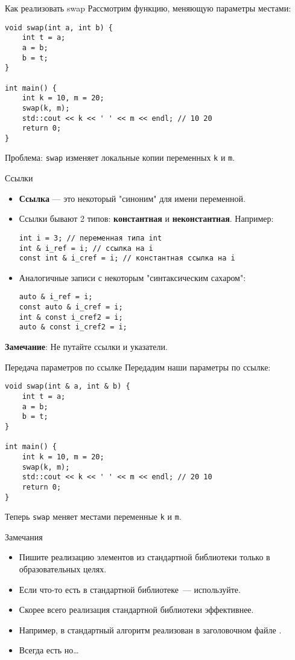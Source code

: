 \documentclass{beamer}
\begin{document}
\begin{frame}[fragile]{Как реализовать swap}
    Рассмотрим функцию, меняющую параметры местами:
    \begin{lstlisting}
void swap(int a, int b) {
    int t = a;
    a = b;
    b = t;
}

int main() {
    int k = 10, m = 20;
    swap(k, m);
    std::cout << k << ' ' << m << endl; // 10 20
    return 0;
}
    \end{lstlisting}
    Проблема: {\tt swap} изменяет локальные копии переменных {\tt k} и {\tt m}.
\end{frame}

\begin{frame}[fragile]{Ссылки}
    \begin{itemize}
        \item {\bf Ссылка} — это некоторый "синоним" для имени переменной.
        \item Ссылки бывают 2 типов: {\bf константная} и {\bf неконстантная}. Например:
            \begin{lstlisting}
int i = 3; // переменная типа int
int & i_ref = i; // ссылка на i
const int & i_cref = i; // константная ссылка на i
            \end{lstlisting}
        \item Аналогичные записи с некоторым "синтаксическим сахаром":
            \begin{lstlisting}
auto & i_ref = i;
const auto & i_cref = i;
int & const i_cref2 = i;
auto & const i_cref2 = i;
            \end{lstlisting}
    \end{itemize}
    {\bf Замечание}: Не путайте ссылки и указатели.
\end{frame}

\begin{frame}[fragile]{Передача параметров по ссылке}
    Передадим наши параметры по ссылке:
    \begin{lstlisting}
void swap(int & a, int & b) {
    int t = a;
    a = b;
    b = t;
}

int main() {
    int k = 10, m = 20;
    swap(k, m);
    std::cout << k << ' ' << m << endl; // 20 10
    return 0;
}
    \end{lstlisting}
    Теперь {\tt swap} меняет местами переменные {\tt k} и {\tt m}.
\end{frame}

\begin{frame}[fragile]{Замечания}
    \begin{itemize}
        \item Пишите реализацию элементов из стандартной библиотеки только в образовательных целях.
        \item Если что-то есть в стандартной библиотеке~--- используйте.
        \item Скорее всего реализация стандартной библиотеки эффективнее.
        \item Например, в стандартный алгоритм  реализован в заголовочном файле .
        \item Всегда есть но\dots
    \end{itemize}
\end{frame}
\end{document}
